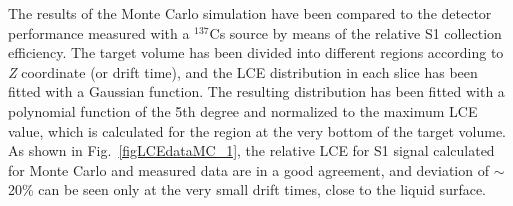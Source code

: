 
The results of the Monte Carlo simulation have been compared to the detector performance measured with a $^{137}$Cs source by means of the relative S1 collection efficiency. The target volume has been divided into different regions according to {\it Z} coordinate (or drift time), and the LCE distribution in each slice has been fitted with a Gaussian function. The resulting  distribution has been fitted with a polynomial function of the 5th degree and normalized to the maximum LCE value, which is calculated for the region at the very bottom of the target volume. As shown in Fig.~\ref{figLCEdataMC_1}, the relative LCE for S1 signal calculated for Monte Carlo and measured data are in a good agreement, and deviation of $\sim$20\% can be seen only at the very small drift times, close to the liquid surface.

